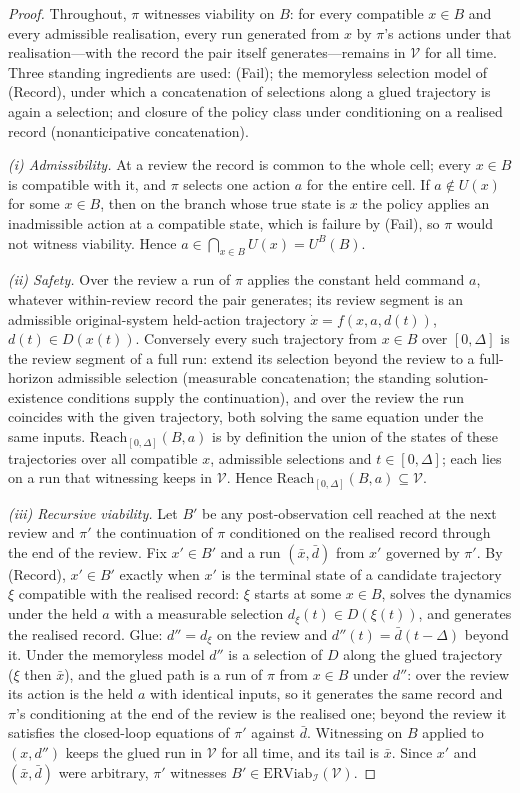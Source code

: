 \documentclass[11pt,a4paper]{article}
\theoremstyle{plain}
\theoremstyle{definition}
\theoremstyle{remark}
\newcommand{\ERViab}{\mathrm{ERViab}}
\newcommand{\cV}{\mathcal{V}}
\newcommand{\cI}{\mathcal{I}}
\newcommand{\Reach}{\mathrm{Reach}}
\begin{document}
\begin{proof}
Throughout, $\pi$ witnesses viability on $B$: for every compatible $x\in B$ and every admissible realisation, every run generated from $x$ by $\pi$'s actions under that realisation---with the record the pair itself generates---remains in $\cV$ for all time. Three standing ingredients are used: (Fail); the memoryless selection model of (Record), under which a concatenation of selections along a glued trajectory is again a selection; and closure of the policy class under conditioning on a realised record (nonanticipative concatenation).

\emph{(i) Admissibility.} At a review the record is common to the whole cell; every $x\in B$ is compatible with it, and $\pi$ selects one action $a$ for the entire cell. If $a\notin U(x)$ for some $x\in B$, then on the branch whose true state is $x$ the policy applies an inadmissible action at a compatible state, which is failure by (Fail), so $\pi$ would not witness viability. Hence $a\in\bigcap_{x\in B}U(x)=U^B(B)$.

\emph{(ii) Safety.} Over the review a run of $\pi$ applies the constant held command $a$, whatever within-review record the pair generates; its review segment is an admissible original-system held-action trajectory $\dot x=f(x,a,d(t))$, $d(t)\in D(x(t))$. Conversely every such trajectory from $x\in B$ over $[0,\Delta]$ is the review segment of a full run: extend its selection beyond the review to a full-horizon admissible selection (measurable concatenation; the standing solution-existence conditions supply the continuation), and over the review the run coincides with the given trajectory, both solving the same equation under the same inputs. $\Reach_{[0,\Delta]}(B,a)$ is by definition the union of the states of these trajectories over all compatible $x$, admissible selections and $t\in[0,\Delta]$; each lies on a run that witnessing keeps in $\cV$. Hence $\Reach_{[0,\Delta]}(B,a)\subseteq\cV$.

\emph{(iii) Recursive viability.} Let $B'$ be any post-observation cell reached at the next review and $\pi'$ the continuation of $\pi$ conditioned on the realised record through the end of the review. Fix $x'\in B'$ and a run $(\bar x,\bar d)$ from $x'$ governed by $\pi'$. By (Record), $x'\in B'$ exactly when $x'$ is the terminal state of a candidate trajectory $\xi$ compatible with the realised record: $\xi$ starts at some $x\in B$, solves the dynamics under the held $a$ with a measurable selection $d_\xi(t)\in D(\xi(t))$, and generates the realised record. Glue: $d''=d_\xi$ on the review and $d''(t)=\bar d(t-\Delta)$ beyond it. Under the memoryless model $d''$ is a selection of $D$ along the glued trajectory ($\xi$ then $\bar x$), and the glued path is a run of $\pi$ from $x\in B$ under $d''$: over the review its action is the held $a$ with identical inputs, so it generates the same record and $\pi$'s conditioning at the end of the review is the realised one; beyond the review it satisfies the closed-loop equations of $\pi'$ against $\bar d$. Witnessing on $B$ applied to $(x,d'')$ keeps the glued run in $\cV$ for all time, and its tail is $\bar x$. Since $x'$ and $(\bar x,\bar d)$ were arbitrary, $\pi'$ witnesses $B'\in\ERViab_\cI(\cV)$.


\end{proof}
\end{document}
